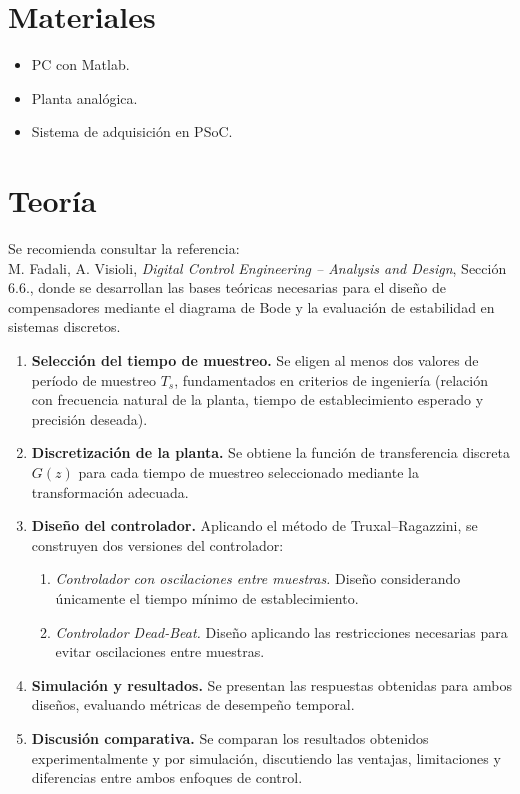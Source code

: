 \section{Materiales}
\begin{itemize}
	\item PC con Matlab.
	\item Planta analógica.
	\item Sistema de adquisición en PSoC.
\end{itemize}

\section{Teoría}
Se recomienda consultar la referencia: \\
M. Fadali, A. Visioli, \textit{Digital Control Engineering – Analysis and Design}, Sección 6.6., donde se desarrollan las bases teóricas necesarias para el diseño de compensadores mediante el diagrama de Bode y la evaluación de estabilidad en sistemas discretos.

\begin{enumerate}
	
	\item \textbf{Selección del tiempo de muestreo.}  
	Se eligen al menos dos valores de período de muestreo $T_s$, fundamentados en criterios de ingeniería (relación con frecuencia natural de la planta, tiempo de establecimiento esperado y precisión deseada).
	
	\item \textbf{Discretización de la planta.}  
	Se obtiene la función de transferencia discreta $G(z)$ para cada tiempo de muestreo seleccionado mediante la transformación adecuada.
	
	\item \textbf{Diseño del controlador.}  
	Aplicando el método de Truxal--Ragazzini, se construyen dos versiones del controlador:
	\begin{enumerate}
		\item \emph{Controlador con oscilaciones entre muestras.}  
		Diseño considerando únicamente el tiempo mínimo de establecimiento.
		
		\item \emph{Controlador Dead-Beat.}  
		Diseño aplicando las restricciones necesarias para evitar oscilaciones entre muestras.
	\end{enumerate}
	
	\item \textbf{Simulación y resultados.}  
	Se presentan las respuestas obtenidas para ambos diseños, evaluando métricas de desempeño temporal.
	
	\item \textbf{Discusión comparativa.}  
	Se comparan los resultados obtenidos experimentalmente y por simulación, discutiendo las ventajas, limitaciones y diferencias entre ambos enfoques de control.
\end{enumerate}
